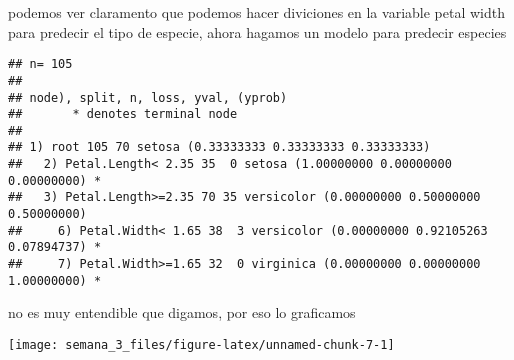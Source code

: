 \documentclass[
]{article}
\newenvironment{Shaded}{\begin{snugshade}}{\end{snugshade}}
\newcommand{\AttributeTok}[1]{\textcolor[rgb]{0.77,0.63,0.00}{#1}}
\newcommand{\ConstantTok}[1]{\textcolor[rgb]{0.00,0.00,0.00}{#1}}
\newcommand{\DecValTok}[1]{\textcolor[rgb]{0.00,0.00,0.81}{#1}}
\newcommand{\FunctionTok}[1]{\textcolor[rgb]{0.00,0.00,0.00}{#1}}
\newcommand{\NormalTok}[1]{#1}
\newcommand{\OtherTok}[1]{\textcolor[rgb]{0.56,0.35,0.01}{#1}}
\newcommand{\SpecialCharTok}[1]{\textcolor[rgb]{0.00,0.00,0.00}{#1}}
\newcommand{\StringTok}[1]{\textcolor[rgb]{0.31,0.60,0.02}{#1}}
\begin{document}
podemos ver claramento que podemos hacer diviciones en la variable petal
width para predecir el tipo de especie, ahora hagamos un modelo para
predecir especies

\begin{Shaded}
\end{Shaded}

\begin{verbatim}
## n= 105 
## 
## node), split, n, loss, yval, (yprob)
##       * denotes terminal node
## 
## 1) root 105 70 setosa (0.33333333 0.33333333 0.33333333)  
##   2) Petal.Length< 2.35 35  0 setosa (1.00000000 0.00000000 0.00000000) *
##   3) Petal.Length>=2.35 70 35 versicolor (0.00000000 0.50000000 0.50000000)  
##     6) Petal.Width< 1.65 38  3 versicolor (0.00000000 0.92105263 0.07894737) *
##     7) Petal.Width>=1.65 32  0 virginica (0.00000000 0.00000000 1.00000000) *
\end{verbatim}

no es muy entendible que digamos, por eso lo graficamos

\begin{Shaded}
\end{Shaded}

\begin{center}\texttt{[image: semana\_3\_files/figure-latex/unnamed-chunk-7-1]} \end{center}

\begin{Shaded}
\end{Shaded}
\end{document}
